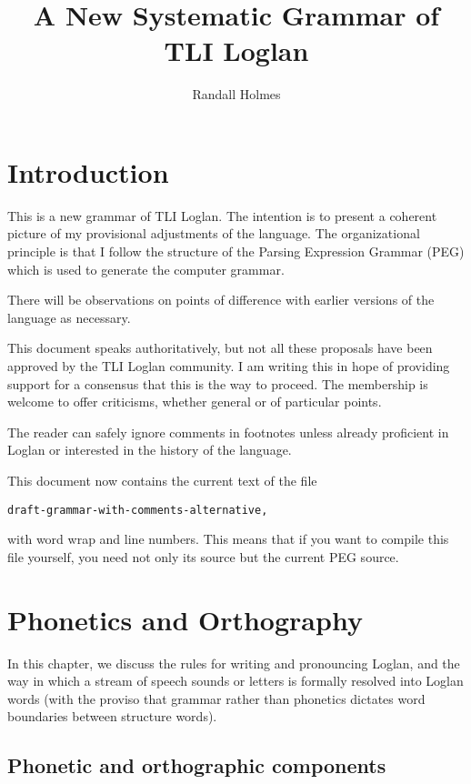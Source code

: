 \documentclass[12pt]{book}
\title{A New Systematic Grammar of TLI Loglan}
\author{Randall Holmes}
\begin{document}
\maketitle

\chapter{Introduction}

This is a new grammar of TLI Loglan.   The intention is to present a coherent picture of my provisional adjustments of the language.  The organizational principle is that I follow the structure of the Parsing  Expression Grammar (PEG) which is used to generate the computer grammar.

There will be observations on points of difference with earlier versions of the language as necessary.

This document speaks authoritatively, but not all these proposals have been approved by the TLI Loglan community.  I am writing this in hope of providing support for a consensus that this is the way to proceed.  The membership is welcome to offer criticisms, whether general or of particular points.

The reader can safely ignore comments in footnotes unless already proficient in Loglan or interested in the history of the language.

This document now contains the current text of the file \begin{center}
\verb|draft-grammar-with-comments-alternative,|  \end{center}
  with word wrap and line numbers.  This means that if you want to compile this file yourself, you need not only its source but the current PEG source.

\chapter{Phonetics and Orthography}

In this chapter, we discuss the rules for writing and pronouncing Loglan, and the way in which a stream of speech sounds or letters is formally resolved into Loglan words (with the proviso that grammar rather than phonetics dictates word boundaries between structure words).

\section{Phonetic and orthographic components}
\end{document}
